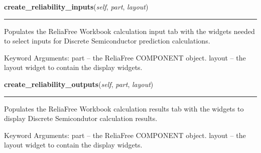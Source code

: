     \label{reliafree:semiconductors:semiconductor:Semiconductor:create_reliability_inputs}

    \vspace{0.5ex}

\hspace{.8\funcindent}\begin{boxedminipage}{\funcwidth}

    \raggedright \textbf{create\_reliability\_inputs}(\textit{self}, \textit{part}, \textit{layout})

    \vspace{-1.5ex}

    \rule{\textwidth}{0.5\fboxrule}
\setlength{\parskip}{2ex}
    Populates the ReliaFree Workbook calculation input tab with the widgets
    needed to select inputs for Discrete Semiconductor prediction 
    calculations.

    Keyword Arguments: part   -- the ReliaFree COMPONENT object. layout -- 
    the layout widget to contain the display widgets.

\setlength{\parskip}{1ex}
    \end{boxedminipage}

    \label{reliafree:semiconductors:semiconductor:Semiconductor:create_reliability_outputs}

    \vspace{0.5ex}

\hspace{.8\funcindent}\begin{boxedminipage}{\funcwidth}

    \raggedright \textbf{create\_reliability\_outputs}(\textit{self}, \textit{part}, \textit{layout})

    \vspace{-1.5ex}

    \rule{\textwidth}{0.5\fboxrule}
\setlength{\parskip}{2ex}
    Populates the ReliaFree Workbook calculation results tab with the 
    widgets to display Discrete Semicondutor calculation results.

    Keyword Arguments: part   -- the ReliaFree COMPONENT object. layout -- 
    the layout widget to contain the display widgets.

\setlength{\parskip}{1ex}
    \end{boxedminipage}

